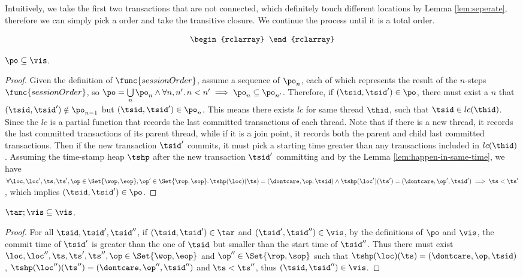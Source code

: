 Intuitively, we take the first two transactions that are not connected, which definitely touch different locations by Lemma \ref{lem:seperate}, therefore we can simply pick a order and take the transitive closure.
We continue the process until it is a total order.

\begin{defn}
    \[
        \begin{rclarray}

        \end{rclarray}
    \]
\end{defn}

\begin{lem}[Session]
    \( \po \subseteq \vis \).
\end{lem}   
\begin{proof}
    Given the definition of \( \func{sessionOrder} \), assume a sequence of \( \po_n \), each of which represents the result of the \( n \)-steps \(\func{sessionOrder} \), so \( \po = \bigcup\limits_{n} \po_n \land \forall n, n' \ldotp n < n' \implies \po_n \subseteq \po_{n'} \).
    Therefore, if \( ( \tsid , \tsid' ) \in \po \), there must exist a \( n \) that \( ( \tsid , \tsid' ) \notin \po_{n-1} \) but \( ( \tsid , \tsid' ) \in \po_{n} \).
    This means there exists \( lc \) for same thread \( \thid \), such that \( \tsid \in lc(\thid) \).
    Since the \( lc \) is a partial function that records the last committed transactions of each thread.
    Note that if there is a new thread, it records the last committed transactions of its parent thread, while if it is a join point, it records both the parent and child last committed transactions.
    Then if the new transaction \( \tsid' \) commits, it must pick a starting time greater than any transactions included in \( lc(\thid) \).
    Assuming the time-stamp heap \( \tshp \) after the new transaction \( \tsid' \) committing and by the Lemma \ref{lem:happen-in-same-time}, we have \( \forall \loc, \loc', \ts, \ts', \op \in \Set{\wop,\eop}, \op' \in \Set{\rop,\sop} \ldotp \tshp(\loc)(\ts) = (\dontcare, \op, \tsid) \land \tshp(\loc')(\ts') = (\dontcare, \op', \tsid') \implies \ts < \ts' \), which implies \( (\tsid, \tsid') \in \po \).
\end{proof}

\begin{lem}[prefix]
    \label{lem:prefix}
    \( \tar; \vis \subseteq \vis \).
\end{lem}
\begin{proof}
    For all \( \tsid, \tsid', \tsid'' \), if \( (\tsid, \tsid') \in \tar \) and \( (\tsid', \tsid'') \in \vis \), by the definitions of \( \po \) and \( \vis \), the commit time of \( \tsid' \) is greater than the one of \( \tsid \) but smaller than the start time of \( \tsid'' \).
    Thus there must exist \( \loc, \loc'', \ts, \ts' , \ts'', \op \in \Set{\wop, \eop}  \) and \( \op'' \in \Set{\rop, \sop } \) such that  \( \tshp(\loc)(\ts) = (\dontcare, \op, \tsid) \), \( \tshp(\loc'')(\ts'') = (\dontcare, \op'', \tsid'') \) and \( \ts < \ts'' \), thus \( ( \tsid, \tsid'' ) \in \vis \).
\end{proof}

